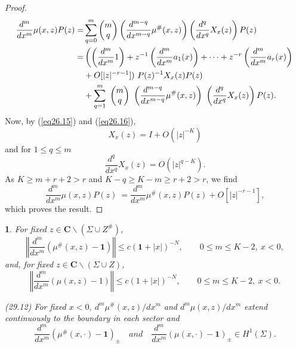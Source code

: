 \documentclass{surv-l}
\theoremstyle{plain}
\newtheorem{prop}[theorem]{\sc{Proposition}}
\theoremstyle{definition}
\numberwithin{equation}{chapter}
\begin{document}
\begin{proof}
\begin{align*}
\frac{d^{m}}{dx^{m}}\mu(x, z)P(z)=&\sum_{q=0}^{m} \left(\begin{array}{@{}c@{}}
m\\
q
\end{array}\right) \left(\frac{d^{m-q}}{dx^{m-q}}\mu^{\#}(x, z)\right)\left(\frac{d^{q}}{dx^{q}}X_{x}(z)\right)P(z)\\
=&\left(\left(\frac{d^{m}}{dx^{m}}1\right)+z^{-1}\left(\frac{d^{m}}{dx^{m}}a_{1}(x)\right)+\cdots +z^{-r}\left(\frac{d^{m}}{dx^{m}}a_{r}(x)\right)\right.\\
&+O[|z|^{-r-1}])\ P(z)^{-1}X_{x}(z)P(z)\\
&+\sum_{q=1}^{m}\ \left(\begin{array}{@{}c@{}}
m\\
q
\end{array}\right)\ \left(\frac{d^{m-q}}{dx^{m-q}}\mu^{\#} (x, z)\right)\ \left(\frac{d^{q}}{dx^{q}}X_{x}(z)\right)P(z).
\end{align*}
Now, by (\ref{eq26.15}) and (\ref{eq26.16}),
\begin{equation*}
X_{x}(z)=I+O(|z|^{-K})
\end{equation*}
and for $1\leq q\leq m$
\begin{equation*}
\frac{d^{q}}{dx^{q}}X_{x}(z)=O(|z|^{q-K}).
\end{equation*}
As $K\geq m+r+2>r$ and $K-q\geq K-m\geq r+2>r$, we find
\begin{equation*}
\frac{d^{m}}{dx^{m}}\mu(x, z)P(z)\ =\frac{d^{m}}{dx^{m}}\mu^{\#}(x, z)P(z)+O[|z|^{-r-1}],
\end{equation*}
which proves the result.
\end{proof}
\begin{prop}\label{prop29.9}
For fixed $z\in \mathbf{C}\backslash (\Sigma\cup Z^{\#})$,
\setcounter{equation}{9}
\begin{equation}\label{eq29.10}
\left\Vert\frac{d^{m}}{dx^{m}}(\mu^{\#} (x, z)-\mathbf{1})\right\Vert\leq c(\mathbf{1}+|x|)^{-N},\qquad 0\leq m\leq K-2,\ x<0,
\end{equation}
and, for fixed $z\in \mathbf{C}\backslash (\Sigma\cup Z)$,
\begin{equation}\label{eq29.11}
\left\Vert\frac{d^{m}}{dx^{m}}(\mu(x, z)-1)\right\Vert\leq c(1+|x|)^{-N},\qquad 0\leq m\leq K-2,\ x<0.
\end{equation}

\emph{(29.12)} For fixed $x<0,\ d^{m}\mu^{\#}(x, z)/dx^{m}$ and $d^{m}\mu(x, z)/dx^{m}$ extend continuously to the boundary in each sector and
\setcounter{equation}{12}
\begin{equation}\label{eq29.13}
\frac{d^{m}}{dx^{m}}(\mu^{\#}(x, \cdot)-\mathbf{1})_{\pm}\quad and\quad \frac{d^{m}}{dx^{m}}(\mu(x, \cdot)-\mathbf{1})_{\pm}\in H^{1}(\Sigma).
\end{equation}
\end{prop}
\end{document}
